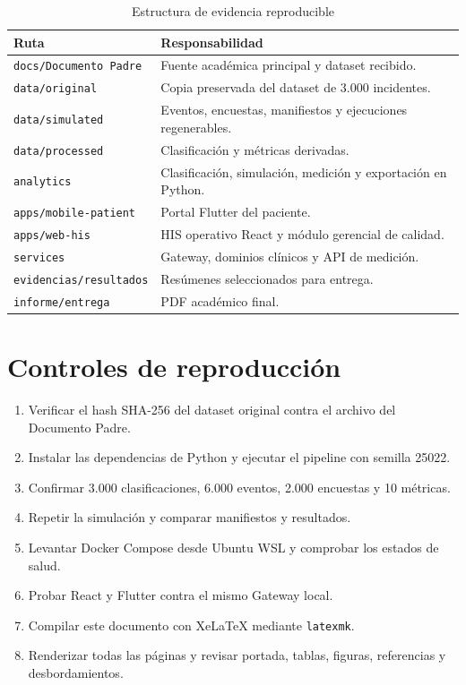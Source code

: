 \begin{table}[H]
\centering
\caption{Estructura de evidencia reproducible}
\begin{tabularx}{\textwidth}{p{4.0cm}Y}
\toprule
Ruta & Responsabilidad \\
\midrule
\texttt{docs/Documento}\allowbreak\texttt{ Padre} & Fuente académica principal y dataset recibido. \\
\texttt{data/original} & Copia preservada del dataset de 3.000 incidentes. \\
\texttt{data/simulated} & Eventos, encuestas, manifiestos y ejecuciones regenerables. \\
\texttt{data/processed} & Clasificación y métricas derivadas. \\
\texttt{analytics} & Clasificación, simulación, medición y exportación en Python. \\
\texttt{apps/mobile-patient} & Portal Flutter del paciente. \\
\texttt{apps/web-his} & HIS operativo React y módulo gerencial de calidad. \\
\texttt{services} & Gateway, dominios clínicos y API de medición. \\
\texttt{evidencias/}\allowbreak\texttt{resultados} & Resúmenes seleccionados para entrega. \\
\texttt{informe/entrega} & PDF académico final. \\
\bottomrule
\end{tabularx}
\end{table}

\section{Controles de reproducción}

\begin{enumerate}
  \item Verificar el hash SHA-256 del dataset original contra el archivo del Documento Padre.
  \item Instalar las dependencias de Python y ejecutar el pipeline con semilla 25022.
  \item Confirmar 3.000 clasificaciones, 6.000 eventos, 2.000 encuestas y 10 métricas.
  \item Repetir la simulación y comparar manifiestos y resultados.
  \item Levantar Docker Compose desde Ubuntu WSL y comprobar los estados de salud.
  \item Probar React y Flutter contra el mismo Gateway local.
  \item Compilar este documento con XeLaTeX mediante \texttt{latexmk}.
  \item Renderizar todas las páginas y revisar portada, tablas, figuras, referencias y desbordamientos.
\end{enumerate}

